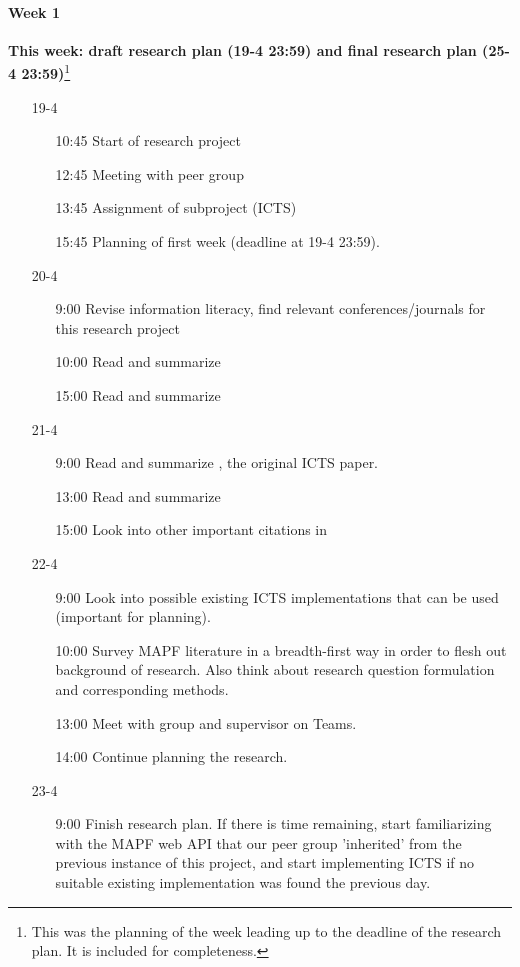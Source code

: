 \documentclass[a4paper,10pt,english]{article}
\begin{document}
	\paragraph{Week 1}
	\textbf{This week: draft research plan (19-4 23:59) and final research plan (25-4 23:59)}\footnote{This was the planning of the week leading up to the deadline of the research plan. It is included for completeness.}
	\begin{enumerate}
		\item[19-4 ] 
		\begin{enumerate}
			\item[10:45] Start of research project
			\item[12:45] Meeting with peer group
			\item[13:45] Assignment of subproject (ICTS)
			\item[15:45] Planning of first week (deadline at 19-4 23:59).
		\end{enumerate}
		\item[20-4] 
		\begin{enumerate}
			\item[9:00] Revise information literacy, find relevant conferences/journals for this research project
			\item[10:00] Read and summarize \cite{stern2019}
			\item[15:00] Read and summarize \cite{mulderij2020}
		\end{enumerate}
		\item[21-4]
		\begin{enumerate}
			\item[9:00] Read and summarize \cite{sharon2011}, the original ICTS paper.
			\item[13:00] Read and summarize \cite{standley2010}
			\item[15:00] Look into other important citations in \cite{sharon2011}
		\end{enumerate}
		\item[22-4] \begin{enumerate}
			\item[9:00] Look into possible existing ICTS implementations that can be used (important for planning).
			\item[10:00] Survey MAPF literature in a breadth-first way in order to flesh out background of research. Also think about research question formulation and corresponding methods.
			\item[13:00] Meet with group and supervisor on Teams.
			\item[14:00] Continue planning the research.
		\end{enumerate}
		\item[23-4]\begin{enumerate}
			\item[9:00]  Finish research plan. If there is time remaining, start familiarizing with the MAPF web API that our peer group 'inherited' from the previous instance of this project, and start implementing ICTS if no suitable existing implementation was found the previous day.
		\end{enumerate}
	\end{enumerate}
\end{document}
